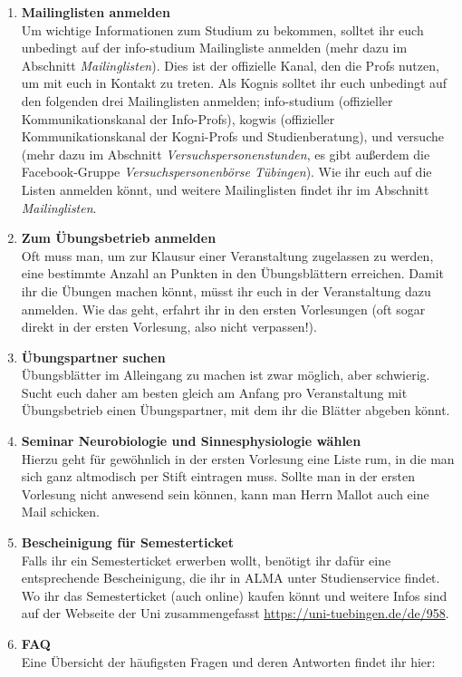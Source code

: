 \begin{enumerate}[label=$\bigcirc$]
  	\item \textbf{Mailinglisten anmelden}\\
  	\ifinfo
  		Um wichtige Informationen zum Studium zu bekommen, solltet ihr euch unbedingt auf der info-studium Mailingliste anmelden (mehr dazu im Abschnitt \textit{Mailinglisten}). Dies ist der offizielle Kanal, den die Profs nutzen, um mit euch in Kontakt zu treten.
  	\else
  		Als Kognis solltet ihr euch unbedingt auf den folgenden drei Mailinglisten anmelden; info-studium (offizieller Kommunikationskanal der Info-Profs), kogwis (offizieller Kommunikationskanal der Kogni-Profs und Studienberatung), und versuche (mehr dazu im Abschnitt \textit{Versuchspersonenstunden}, es gibt außerdem die Facebook-Gruppe \textit{Versuchspersonenbörse Tübingen}). Wie ihr euch auf die Listen anmelden könnt, und weitere Mailinglisten findet ihr im Abschnitt \textit{Mailinglisten}.
  	\fi
  	
	\item \textbf{Zum Übungsbetrieb anmelden} \\
	  	Oft muss man, um zur Klausur einer Veranstaltung zugelassen zu werden, eine bestimmte Anzahl an Punkten in den Übungsblättern erreichen. Damit ihr die Übungen machen könnt, müsst ihr euch in der Veranstaltung dazu anmelden. Wie das geht, erfahrt ihr in den ersten Vorlesungen (oft sogar direkt in der ersten Vorlesung, also nicht verpassen!).
	  	
  	\item \textbf{Übungspartner suchen} \\
	  	Übungsblätter im Alleingang zu machen ist zwar möglich, aber schwierig. Sucht euch daher am besten gleich am Anfang pro Veranstaltung mit Übungsbetrieb einen Übungspartner, mit dem ihr die Blätter abgeben könnt.
	  	
	 \ifinfo
	 \else
	 \item  \textbf{Seminar Neurobiologie und Sinnesphysiologie wählen}\\
	 	Hierzu geht für gewöhnlich in der ersten Vorlesung eine Liste rum, in die man sich ganz altmodisch per Stift eintragen muss. Sollte man in der ersten Vorlesung nicht anwesend sein können, kann man Herrn Mallot auch eine Mail schicken.
	 \fi

	\item \textbf{Bescheinigung für Semesterticket} \\	
		Falls ihr ein Semesterticket erwerben wollt, benötigt ihr dafür eine entsprechende Bescheinigung, die ihr in ALMA unter Studienservice findet. Wo ihr das Semesterticket (auch online) kaufen könnt und weitere Infos sind auf der Webseite der Uni zusammengefasst \url{https://uni-tuebingen.de/de/958}.
	
	\item \textbf{FAQ} \\
	\ifinfo
		Eine Übersicht der häufigsten Fragen und deren Antworten findet ihr hier:
	\else
	\fi
	
  \end{enumerate}

